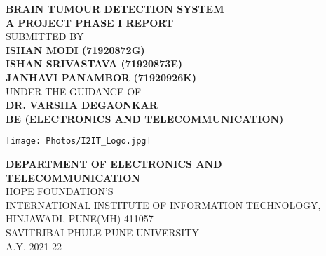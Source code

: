 \begin{center}
\vspace{0.8cm}
{\bf \LARGE BRAIN TUMOUR DETECTION SYSTEM} \\ \vspace{1.5 cm}
{\large \bf A PROJECT PHASE I REPORT}\\ \vspace{1 cm}
{\large SUBMITTED BY}\\ \vspace{0.3 cm}
{\large \bf  ISHAN MODI (71920872G)}\\ \vspace{0.1 cm}
{\large \bf  ISHAN SRIVASTAVA (71920873E)}\\ \vspace{0.1 cm}
{\large \bf  JANHAVI PANAMBOR (71920926K)}\\ \vspace{1.5 cm}
{ UNDER THE GUIDANCE OF}\\ \vspace{0.2 cm}
{ \large \bf  DR. VARSHA DEGAONKAR}\\ \vspace{1 cm}
{\large \textbf{BE (ELECTRONICS AND TELECOMMUNICATION)}}\\ \vspace{0.5 cm}
\begin{figure*}[!h]
\centering
\texttt{[image: Photos/I2IT\_Logo.jpg]}
\end{figure*} \vspace{0.5 cm} 
{\textbf{DEPARTMENT OF ELECTRONICS AND TELECOMMUNICATION}}\\%
{HOPE FOUNDATION'S}\\ 
{INTERNATIONAL INSTITUTE OF INFORMATION TECHNOLOGY,} \\%
{HINJAWADI, PUNE(MH)-411057}\\ %
{SAVITRIBAI PHULE PUNE UNIVERSITY}\\ %
{A.Y. 2021-22}
\end{center} 
